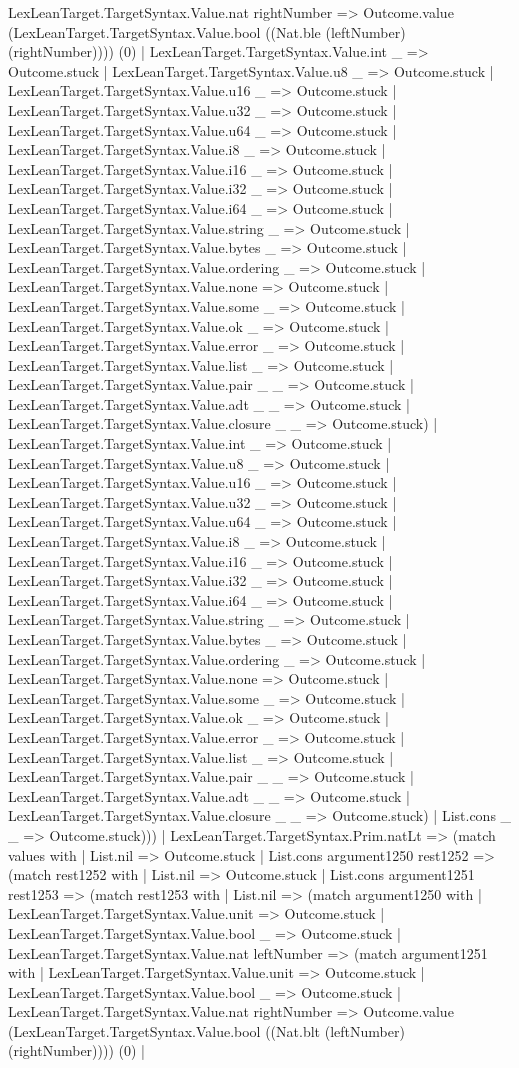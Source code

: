\documentclass[11pt]{article}
\begin{document}
LexLeanTarget.TargetSyntax.Value.nat rightNumber => Outcome.value (LexLeanTarget.TargetSyntax.Value.bool ((Nat.ble (leftNumber) (rightNumber)))) (0) | LexLeanTarget.TargetSyntax.Value.int \_ => Outcome.stuck | LexLeanTarget.TargetSyntax.Value.u8 \_ => Outcome.stuck | LexLeanTarget.TargetSyntax.Value.u16 \_ => Outcome.stuck | LexLeanTarget.TargetSyntax.Value.u32 \_ => Outcome.stuck | LexLeanTarget.TargetSyntax.Value.u64 \_ => Outcome.stuck | LexLeanTarget.TargetSyntax.Value.i8 \_ => Outcome.stuck | LexLeanTarget.TargetSyntax.Value.i16 \_ => Outcome.stuck | LexLeanTarget.TargetSyntax.Value.i32 \_ => Outcome.stuck | LexLeanTarget.TargetSyntax.Value.i64 \_ => Outcome.stuck | LexLeanTarget.TargetSyntax.Value.string \_ => Outcome.stuck | LexLeanTarget.TargetSyntax.Value.bytes \_ => Outcome.stuck | LexLeanTarget.TargetSyntax.Value.ordering \_ => Outcome.stuck | LexLeanTarget.TargetSyntax.Value.none => Outcome.stuck | LexLeanTarget.TargetSyntax.Value.some \_ => Outcome.stuck | LexLeanTarget.TargetSyntax.Value.ok \_ => Outcome.stuck | LexLeanTarget.TargetSyntax.Value.error \_ => Outcome.stuck | LexLeanTarget.TargetSyntax.Value.list \_ => Outcome.stuck | LexLeanTarget.TargetSyntax.Value.pair \_ \_ => Outcome.stuck | LexLeanTarget.TargetSyntax.Value.adt \_ \_ => Outcome.stuck | LexLeanTarget.TargetSyntax.Value.closure \_ \_ => Outcome.stuck) | LexLeanTarget.TargetSyntax.Value.int \_ => Outcome.stuck | LexLeanTarget.TargetSyntax.Value.u8 \_ => Outcome.stuck | LexLeanTarget.TargetSyntax.Value.u16 \_ => Outcome.stuck | LexLeanTarget.TargetSyntax.Value.u32 \_ => Outcome.stuck | LexLeanTarget.TargetSyntax.Value.u64 \_ => Outcome.stuck | LexLeanTarget.TargetSyntax.Value.i8 \_ => Outcome.stuck | LexLeanTarget.TargetSyntax.Value.i16 \_ => Outcome.stuck | LexLeanTarget.TargetSyntax.Value.i32 \_ => Outcome.stuck | LexLeanTarget.TargetSyntax.Value.i64 \_ => Outcome.stuck | LexLeanTarget.TargetSyntax.Value.string \_ => Outcome.stuck | LexLeanTarget.TargetSyntax.Value.bytes \_ => Outcome.stuck | LexLeanTarget.TargetSyntax.Value.ordering \_ => Outcome.stuck | LexLeanTarget.TargetSyntax.Value.none => Outcome.stuck | LexLeanTarget.TargetSyntax.Value.some \_ => Outcome.stuck | LexLeanTarget.TargetSyntax.Value.ok \_ => Outcome.stuck | LexLeanTarget.TargetSyntax.Value.error \_ => Outcome.stuck | LexLeanTarget.TargetSyntax.Value.list \_ => Outcome.stuck | LexLeanTarget.TargetSyntax.Value.pair \_ \_ => Outcome.stuck | LexLeanTarget.TargetSyntax.Value.adt \_ \_ => Outcome.stuck | LexLeanTarget.TargetSyntax.Value.closure \_ \_ => Outcome.stuck) | List.cons \_ \_ => Outcome.stuck))) | LexLeanTarget.TargetSyntax.Prim.natLt => (match values with | List.nil => Outcome.stuck | List.cons argument1250 rest1252 => (match rest1252 with | List.nil => Outcome.stuck | List.cons argument1251 rest1253 => (match rest1253 with | List.nil => (match argument1250 with | LexLeanTarget.TargetSyntax.Value.unit => Outcome.stuck | LexLeanTarget.TargetSyntax.Value.bool \_ => Outcome.stuck | LexLeanTarget.TargetSyntax.Value.nat leftNumber => (match argument1251 with | LexLeanTarget.TargetSyntax.Value.unit => Outcome.stuck | LexLeanTarget.TargetSyntax.Value.bool \_ => Outcome.stuck | LexLeanTarget.TargetSyntax.Value.nat rightNumber => Outcome.value (LexLeanTarget.TargetSyntax.Value.bool ((Nat.blt (leftNumber) (rightNumber)))) (0) | 
\end{document}
